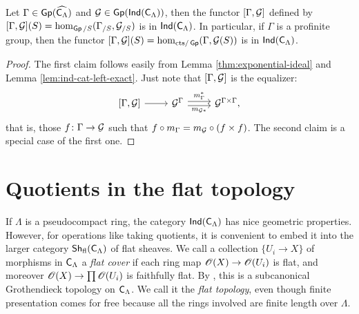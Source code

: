 \begin{corollary}\label{thm:framed-deformation}
Let $\Gamma\in \operatorname{\mathsf{Gp}}(\widehat{\mathsf{C}_\Lambda})$ and 
$\mathcal{G}\in \operatorname{\mathsf{Gp}}(\operatorname{\mathsf{Ind}}(\mathsf{C}_\Lambda))$, then the functor 
$[\Gamma,\mathcal{G}]$ defined by 
$[\Gamma,\mathcal{G}](S) = \hom_{\operatorname{\mathsf{Gp}}/S}(\Gamma_{/S},\mathcal{G}_{/S})$ 
is in $\operatorname{\mathsf{Ind}}(\mathsf{C}_\Lambda)$. In particular, if $\Gamma$ is a 
profinite group, then the functor 
$[\Gamma,\mathcal{G}](S) = \hom_{\mathrm{cts}/\operatorname{\mathsf{Gp}}}(\Gamma,\mathcal{G}(S))$ is in $\operatorname{\mathsf{Ind}}(\mathsf{C}_\Lambda)$. 
\end{corollary}
\begin{proof}
The first claim follows easily from Lemma \ref{thm:exponential-ideal} and 
Lemma \ref{lem:ind-cat-left-exact}. Just note that $[\Gamma,\mathcal{G}]$ is the 
equalizer:
\[
\begin{tikzcd}
	{[\Gamma,\cG]} \ar[r]
		& \cG^\Gamma \ar[r, "m_\Gamma^\ast", shift left=.5ex] \ar[r, "m_{\cG\ast}"', shift right=.5ex]
		& \cG^{\Gamma\times \Gamma} ,
\end{tikzcd}
\]
that is, those $f\colon \Gamma\to \mathcal{G}$ such that 
$f\circ m_\Gamma = m_{\mathcal{G}}\circ(f\times f)$. The second claim is a special 
case of the first one. 
\end{proof}





\section{Quotients in the flat topology}

If $\Lambda$ is a pseudocompact ring, the category 
$\operatorname{\mathsf{Ind}}(\mathsf{C}_\Lambda)$ has nice geometric properties. However, 
for operations like taking quotients, it is convenient to embed it into the 
larger category $\operatorname{\mathsf{Sh}}_{\mathrm{fl}}(\mathsf{C}_\Lambda)$ of flat sheaves. We call a collection 
$\{U_i\to X\}$ of morphisms in $\mathsf{C}_\Lambda$ a \emph{flat cover} if each 
ring map $\mathscr{O}(X)\to \mathscr{O}(U_i)$ is flat, and moreover 
$\mathscr{O}(X)\to \prod \mathscr{O}(U_i)$ is faithfully flat. By \cite[IV 6.3.1]{sga3-1}, this 
is a subcanonical Grothendieck topology on $\mathsf{C}_\Lambda$. We call it the 
\emph{flat topology}, even though finite presentation comes for free because 
all the rings involved are finite length over $\Lambda$. 

